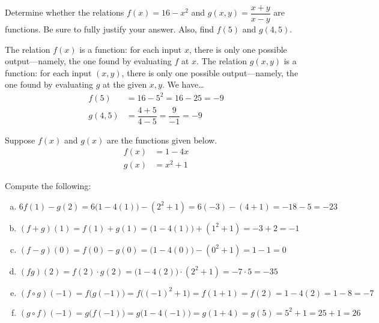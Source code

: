 \documentclass[11pt,letterpaper]{article}
\begin{document}
\newpage



 Determine whether the relations $f(x)= 16 - x^2$ and $g(x, y)= \dfrac{x + y}{x - y}$ are functions. Be sure to fully justify your answer. Also, find $f(5)$ and $g(4, 5)$. \pspace

\sol The relation $f(x)$ is a function: for each input $x$, there is only one possible output---namely, the one found by evaluating $f$ at $x$. The relation $g(x, y)$ is a function: for each input $(x, y)$, there is only one possible output---namely, the one found by evaluating $g$ at the given $x, y$. We have\dots
	\[
	\begin{aligned}
	f(5)&= 16 - 5^2= 16 - 25= -9 \\[0.3cm]
	g(4, 5)&= \dfrac{4 + 5}{4 - 5}= \dfrac{9}{-1}= -9
	\end{aligned}
	\]



\newpage



 Suppose $f(x)$ and $g(x)$ are the functions given below. 
	\[
	\begin{aligned}
	f(x)&= 1 - 4x \\[0.3cm]
	g(x)&= x^2 + 1
	\end{aligned}
	\]

Compute the following: \pspace
        \begin{enumerate}[(a)]
        \item $6f(1) - g(2)= 6 \big(1 - 4(1) \big) - (2^2 + 1)= 6(-3) - (4 + 1)= -18 - 5= -23$ \vfill
        \item $(f + g)(1)= f(1) + g(1)= \big(1 - 4(1) \big) + (1^2 + 1)= -3 + 2= -1$ \vfill
        \item $(f - g)(0)= f(0) - g(0)= \big(1 - 4(0) \big) - (0^2 + 1)= 1 - 1= 0$ \vfill
        \item $(fg)(2)= f(2) \cdot g(2)= \big(1 - 4(2) \big) \cdot (2^2 + 1)= -7 \cdot 5= -35$ \vfill
        \item $(f \circ g)(-1)= f \big( g(-1) \big)= f \big( (-1)^2 + 1 \big)= f(1 + 1)= f(2)= 1 - 4(2)= 1 - 8= -7$ \vfill
        \item $(g \circ f)(-1)= g \big( f(-1) \big)= g \big( 1 - 4(-1) \big)= g(1 + 4)= g(5)= 5^2 + 1= 25 + 1= 26$ \vfill
        \end{enumerate} 
\end{document}
